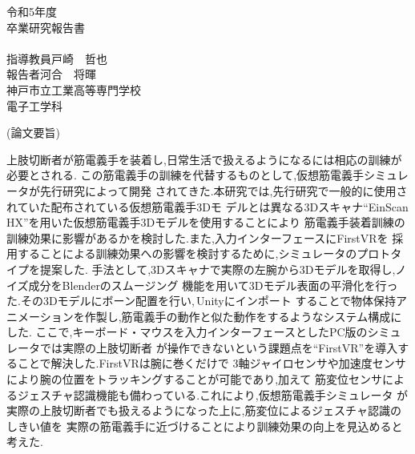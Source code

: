\documentclass{ltjsreport}
\begin{document}
\begin{titlepage}
\begin{center}
\huge 令和5年度\\
\vspace{30pt}
\huge 卒業研究報告書\\
\vspace{50pt}
\HUGE{}\\
\vspace{250pt}
\huge 指導教員\hspace{10pt}戸崎　哲也\\
\huge 報告者\hspace{28pt}河合　将暉\\
\vspace{50pt}
\huge 神戸市立工業高等専門学校\\
\huge 電子工学科
\end{center}
\end{titlepage}
\restoregeometry
\clearpage

\begin{center}
\LARGE (論文要旨)
\end{center}

上肢切断者が筋電義手を装着し,日常生活で扱えるようになるには相応の訓練が必要とされる.
この筋電義手の訓練を代替するものとして,仮想筋電義手シミュレータが先行研究によって開発
されてきた.本研究では,先行研究で一般的に使用されていた配布されている仮想筋電義手3Dモ
デルとは異なる3Dスキャナ``EinScan HX''を用いた仮想筋電義手3Dモデルを使用することにより
筋電義手装着訓練の訓練効果に影響があるかを検討した.また,入力インターフェースにFirstVRを
採用することによる訓練効果への影響を検討するために,シミュレータのプロトタイプを提案した.
手法として,3Dスキャナで実際の左腕から3Dモデルを取得し,ノイズ成分をBlenderのスムージング
機能を用いて3Dモデル表面の平滑化を行った.その3Dモデルにボーン配置を行い,\,Unityにインポート
することで物体保持アニメーションを作製し,筋電義手の動作と似た動作をするようなシステム構成にした.
ここで,キーボード・マウスを入力インターフェースとしたPC版のシミュレータでは実際の上肢切断者
が操作できないという課題点を``FirstVR''を導入することで解決した.FirstVRは腕に巻くだけで
3軸ジャイロセンサや加速度センサにより腕の位置をトラッキングすることが可能であり,加えて
筋変位センサによるジェスチャ認識機能も備わっている.これにより,仮想筋電義手シミュレータ
が実際の上肢切断者でも扱えるようになった上に,筋変位によるジェスチャ認識のしきい値を
実際の筋電義手に近づけることにより訓練効果の向上を見込めると考えた.
\end{document}
